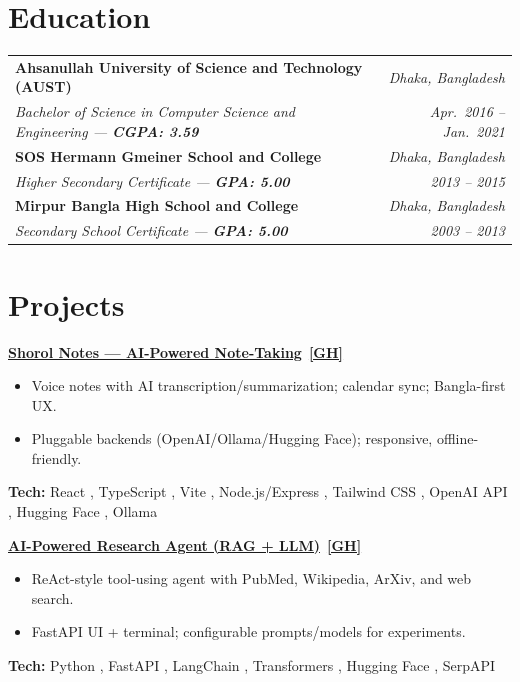 \documentclass[10pt,letterpaper]{article}
\newcommand{\pill}[1]{%
  \begingroup\setlength{\fboxsep}{1.2pt}%
  \colorbox{brandblue!12}{\textcolor{brandblue}{\scriptsize #1}}%
  \endgroup
}
\newenvironment{project}{%
  \begin{tcolorbox}[
    enhanced,breakable,
    colback=white,colframe=white,
    borderline west={0.8pt}{0pt}{rail}, %
    left=10pt,right=0pt,top=2pt,bottom=2pt,
    boxsep=0pt,arc=0pt,outer arc=0pt,
    before skip=10pt,after skip=10pt
  ]%
  \setlength{\parskip}{6pt}\setlength{\parindent}{0pt}%
}{\end{tcolorbox}}
\newcommand{\ghicon}{\ifdefined\faGithub \faGithub \else \textbf{[GH]} \fi}
\newenvironment{projlist}{\begin{itemize}[leftmargin=*,nosep,topsep=0pt]\setlength{\itemsep}{1pt}}{\end{itemize}}
\newcommand{\ProjectHeading}[2]{\textbf{\href{#2}{#1}}\ \href{#2}{\ghicon}}
\begin{document}

\section{Education}

\begin{tabularx}{\linewidth}{@{}X r@{}}
\textbf{Ahsanullah University of Science and Technology (AUST)} & \textit{Dhaka, Bangladesh} \\
\textit{Bachelor of Science in Computer Science and Engineering — \textbf{CGPA: 3.59}} & \textit{Apr.\ 2016 -- Jan.\ 2021} \\
[6pt]
\textbf{SOS Hermann Gmeiner School and College} & \textit{Dhaka, Bangladesh} \\
\textit{Higher Secondary Certificate — \textbf{GPA: 5.00}} & \textit{2013 -- 2015} \\
[6pt]
\textbf{Mirpur Bangla High School and College} & \textit{Dhaka, Bangladesh} \\
\textit{Secondary School Certificate — \textbf{GPA: 5.00}} & \textit{2003 -- 2013} \\
\end{tabularx}


\section{Projects}

\begin{project}
  \ProjectHeading{Shorol Notes — AI-Powered Note-Taking}{https://github.com/Mehedi-Hasan-Abir/Shorol-Notes-AI-Powered}
  \begin{projlist}
    \item Voice notes with AI transcription/summarization; calendar sync; Bangla-first UX.
    \item Pluggable backends (OpenAI/Ollama/Hugging Face); responsive, offline-friendly.
  \end{projlist}
  {\footnotesize \textbf{Tech:} \pill{React}, \pill{TypeScript}, \pill{Vite}, \pill{Node.js/Express}, \pill{Tailwind CSS}, \pill{OpenAI API}, \pill{Hugging Face}, \pill{Ollama}}
\end{project}

\begin{project}
  \ProjectHeading{AI-Powered Research Agent (RAG + LLM)}{https://github.com/Mehedi-Hasan-Abir/AI_Powered_Research_Agent-LLM-}
  \begin{projlist}
    \item ReAct-style tool-using agent with PubMed, Wikipedia, ArXiv, and web search.
    \item FastAPI UI + terminal; configurable prompts/models for experiments.
  \end{projlist}
  {\footnotesize \textbf{Tech:} \pill{Python}, \pill{FastAPI}, \pill{LangChain}, \pill{Transformers}, \pill{Hugging Face}, \pill{SerpAPI}}
\end{project}
\end{document}
